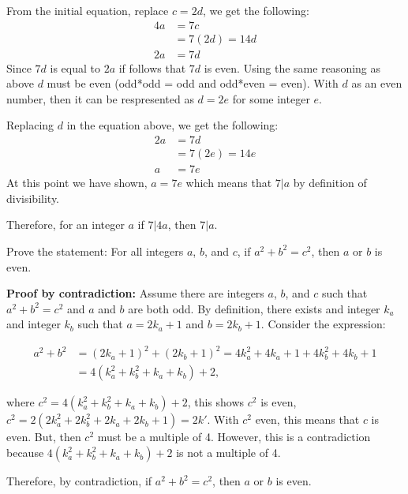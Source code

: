 \begin{questions}
\begin{solution}
  From the initial equation, replace $c=2d$, we get the following: 
  \begin{align*}
    4a &= 7c \\
      &= 7(2d) = 14d \\
    2a &= 7d \tag{divide by 2}
  \end{align*}
  Since $7d$ is equal to $2a$ if follows that $7d$ is even. Using the same reasoning as above $d$ must be even (odd*odd = odd and odd*even = even).  With $d$ as an even number, then it can be respresented as $d = 2e$ for some integer $e$. 

  Replacing $d$ in the equation above, we get the following:
  \begin{align*}
    2a &= 7d \\
      &= 7(2e) = 14e \\
    a &= 7e \tag{divide by 2}
  \end{align*}
  At this point we have shown, $a = 7e$ which means that $7 | a$ by definition of divisibility. 

  Therefore, for an integer $a$ if $7 | 4a$, then $7 | a$.

  \end{solution}


\bonusquestion[4] Prove the statement: For all integers $a$, $b$, and $c$, if $a^2 + b^2 = c^2$, then $a$ or $b$ is even.
   \ifprintanswers
        \vspace{-10pt}
    \fi
\begin{solution} 
\textbf{Proof by contradiction:} Assume there are integers $a$, $b$, and $c$ such that $a^2 + b^2 = c^2$ and $a$ and $b$ are both odd.  By definition, there exists and integer $k_a$ and integer $k_b$ such that $a = 2k_a + 1$ and $b = 2k_b + 1$.  Consider the expression: 

\begin{align*}
  a^2 + b^2 &= (2k_a +1)^2 + (2k_b + 1)^2 = 4k_a^2 + 4k_a + 1 + 4k_b^2 + 4k_b + 1 \\
   &= 4(k_a^2 + k_b^2 + k_a + k_b) + 2,
\end{align*}

where $c^2 = 4(k_a^2 + k_b^2 + k_a + k_b) + 2$, this shows $c^2$ is even, $c^2 = 2(2k_a^2 + 2k_b^2 + 2k_a + 2k_b + 1) = 2k'$.  With $c^2$ even, this means that $c$ is even.  But, then $c^2$ must be a multiple of 4. However, this is a contradiction because $4(k_a^2 + k_b^2 + k_a + k_b) + 2$ is not a multiple of 4. 

Therefore, by contradiction, if $a^2 + b^2 = c^2$, then $a$ or $b$ is even.
\end{solution}



\end{questions}
